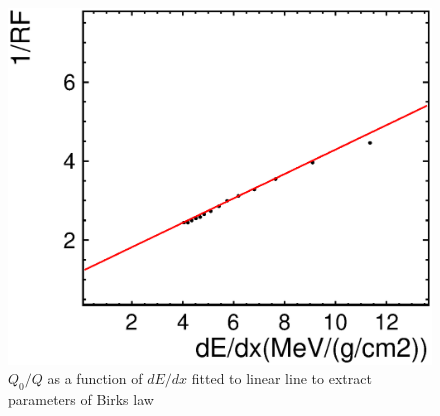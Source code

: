 %
\begin{figure}[!htb]
  \begin{center}
    \includegraphics[width=0.8\hsize,clip]{./fig/RFresult2.eps}
    \caption{$Q_0/Q$ as a function of $dE/dx$ fitted to linear line to extract parameters of Birks law}
    \label{Fig:Preco}
  \end{center}
\end{figure}
%

